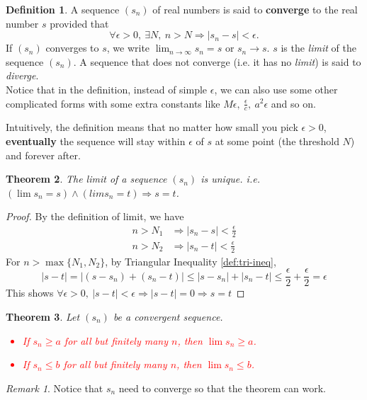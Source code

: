 \documentclass[12pt, lettersize]{book}
\theoremstyle{plain}
\newtheorem{thm}{Theorem}[section]
\theoremstyle{definition}
\newtheorem{dfn}[thm]{Definition}
\theoremstyle{remark}
\newtheorem*{rem}{Remark}
\begin{document}
		\begin{dfn}\label{def:limit}
		A sequence $(s_n)$ of real numbers is said to \textbf{converge} to the real number \emph{$s$} provided that
		\begin{displaymath}
			\forall \epsilon > 0,\ \exists N,\ n > N \Rightarrow |s_n-s| < \epsilon.
		\end{displaymath}
		If $(s_n)$ converges to $s$, we write $\lim_{n\rightarrow \infty}s_n=s$ or $s_n\rightarrow s$. $s$ is the \emph{limit} of the sequence $(s_n)$.
		A sequence that does not converge (i.e. it has no \emph{limit}) is said to \emph{diverge}.\\
		Notice that in the definition, instead of simple $\epsilon$, we can also use some other complicated forms with some extra constants like $M\epsilon,\ \frac{\epsilon}{c},\ a^2\epsilon$ and so on.
		\end{dfn}
	
		Intuitively, the definition means that no matter how small you pick $\epsilon>0$, \textbf{eventually} the sequence will stay within $\epsilon$ of $s$ at some point (the threshold $N$) and forever after.
	
		\begin{thm}
		The limit of a sequence $(s_n)$ is unique. i.e. $(\lim s_n=s) \land (lim s_n=t) \Rightarrow s=t$.
		\end{thm}
		\begin{proof}
		By the definition of limit, we have
		\begin{align*}
			n > N_1 &\Rightarrow |s_n-s| < \frac{\epsilon}{2}\\
			n > N_2 &\Rightarrow |s_n-t| < \frac{\epsilon}{2}
		\end{align*}
		For $n>\max\{N_1,N_2\}$, by Triangular Inequality \ref{def:tri-ineq},
		\begin{displaymath}
			|s-t|=|(s-s_n)+(s_n-t)|\leq |s-s_n|+|s_n-t|\leq \frac{\epsilon}{2}+\frac{\epsilon}{2}=\epsilon
		\end{displaymath}
		This shows $\forall \epsilon>0,\ |s-t|<\epsilon\Rightarrow |s-t|=0\Rightarrow s=t$
		\end{proof}
		\newpage
		
		\begin{thm}
		Let $(s_n)$ be a convergent sequence.\textcolor{red}{
		\begin{itemize}
			\item If $s_n\geq a$ for all but finitely many $n$, then $\lim s_n\geq a$.
			\item If $s_n\leq b$ for all but finitely many $n$, then $\lim s_n\leq b$.
		\end{itemize}}
		\end{thm}
		\begin{rem}
			Notice that $s_n$ need to converge so that the theorem can work.
		\end{rem}
		
\end{document}
